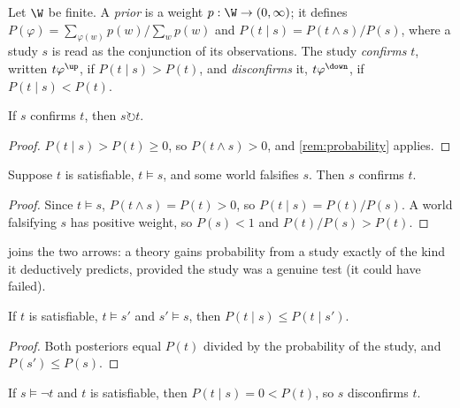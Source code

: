 \begin{definition}\label{def:confirm}
Let $\W$ be finite. A \emph{prior} is a weight $p:\W\to(0,\infty)$; it defines
$P(\varphi)=\sum_{\varphi(w)}p(w)\big/\sum_{w}p(w)$ and
$P(t\mid s)=P(t\wedge s)/P(s)$, where a study $s$ is read as the conjunction of its observations.
The study \emph{confirms} $t$, written $t\varphi^{\up}$, if $P(t\mid s)>P(t)$, and
\emph{disconfirms} it, $t\varphi^{\down}$, if $P(t\mid s)<P(t)$.
\end{definition}

\begin{proposition}\label{prop:confsupp}
If $s$ confirms $t$, then $s\circlearrowright t$.
\end{proposition}

\begin{proof}
$P(t\mid s)>P(t)\ge0$, so $P(t\wedge s)>0$, and \cref{rem:probability} applies.
\end{proof}

\begin{theorem}\label{thm:hd}
Suppose $t$ is satisfiable, $t\models s$, and some world falsifies $s$. Then $s$ confirms $t$.
\end{theorem}

\begin{proof}
Since $t\models s$, $P(t\wedge s)=P(t)>0$, so $P(t\mid s)=P(t)/P(s)$. A world falsifying $s$ has
positive weight, so $P(s)<1$ and $P(t)/P(s)>P(t)$.
\end{proof}

 joins the two arrows: a theory gains probability from a study exactly of the kind it
deductively predicts, provided the study was a genuine test (it could have failed).

\begin{proposition}\label{prop:ascend}
If $t$ is satisfiable, $t\models s'$ and $s'\models s$, then $P(t\mid s)\le P(t\mid s')$.
\end{proposition}

\begin{proof}
Both posteriors equal $P(t)$ divided by the probability of the study, and $P(s')\le P(s)$.
\end{proof}

\begin{proposition}\label{prop:qpopper}
If $s\models\neg t$ and $t$ is satisfiable, then $P(t\mid s)=0<P(t)$, so $s$ disconfirms $t$.
\end{proposition}

